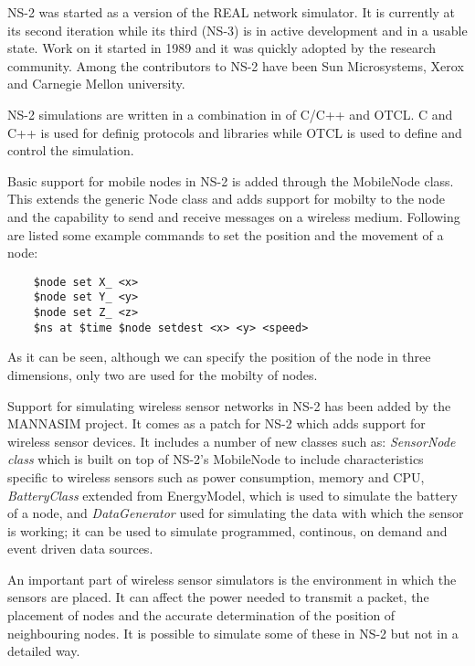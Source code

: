 \label{subsec:ns2}

NS-2 was started as a version of the REAL network simulator. It is currently at its 
second iteration while its third (NS-3) is in active development and in a usable state.
Work on it started in 1989 and it was quickly adopted by the research community.
Among the contributors to NS-2 have been Sun Microsystems, Xerox and Carnegie Mellon 
university. 

NS-2 simulations are written in a combination in of C/C++ and OTCL. C and C++ is 
used for definig protocols and libraries while OTCL is used to define and control
the simulation.

Basic support for mobile nodes in NS-2 is added through the MobileNode class. This extends
the generic Node class and adds support for mobilty to the node and the capability to
send and receive messages on a wireless medium. 
Following are listed some example commands to set the position and the movement of a node:
\lstset{numbers=none,captionpos=b,frame=single,language=C,caption=Commands to set the position and movement of a node,label=lst:saddrule}
\begin{lstlisting}
	$node set X_ <x>
	$node set Y_ <y>
	$node set Z_ <z>
	$ns at $time $node setdest <x> <y> <speed>
\end{lstlisting}
As it can be seen, although we can specify the position of the node in three dimensions,
only two are used for the mobilty of nodes.

Support for simulating wireless sensor networks in NS-2 has been added by the 
MANNASIM project\cite{manasim}. It comes as
a patch for NS-2 which adds support for wireless sensor devices. It includes a number of
new classes such as: \textit{SensorNode class} which is built on top of NS-2's MobileNode 
to include characteristics specific to wireless sensors such as power 
consumption, memory and CPU, \textit{BatteryClass} extended from EnergyModel, 
which is used to simulate
the battery of a node, and \textit{DataGenerator} used for simulating the data 
with which the sensor is
working; it can be used to simulate programmed, continous, on demand and event 
driven
data sources.



An important part of wireless sensor simulators is the environment in which the sensors
are placed. It can affect the power needed to transmit a packet, the placement of nodes
and the accurate determination of the position of neighbouring nodes. It is possible to
simulate some of these in NS-2 but not in a detailed way.
